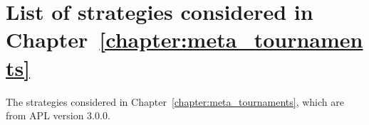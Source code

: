 \section{List of strategies considered in Chapter~\ref{chapter:meta_tournaments}}\label{app:list_of_players}

The strategies considered in Chapter~\ref{chapter:meta_tournaments},
which are from APL version 3.0.0.

\begin{multicols}{3}
	\begin{enumerate}
		
	\end{enumerate}
\end{multicols}
